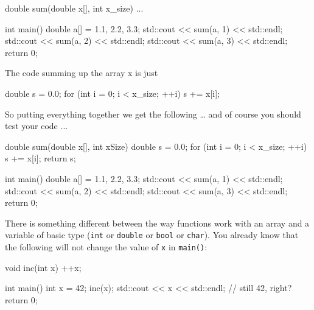 \begin{consolethree}[escapeinside=||]
double sum(double x[], int x_size)
{
    ...
}

int main()
{
    double a[] = {1.1, 2.2, 3.3};
    std::cout << sum(a, 1) << std::endl;
    std::cout << sum(a, 2) << std::endl;
    std::cout << sum(a, 3) << std::endl;
    return 0;
}
\end{consolethree}

The code summing up the array x is just

\begin{consolethree}[escapeinside=||]
double s = 0.0;
for (int i = 0; i < x\_size; ++i)
{
    s += x[i];
}
\end{consolethree}

So putting everything together we get the following \ldots{} and of
course you should test your code ...

\begin{consolethree}[escapeinside=||]
double sum(double x[], int xSize)
{
    double s = 0.0;
    for (int i = 0; i < x\_size; ++i)
    {
        s += x[i];
    }
    return s;
}

int main()
{
    double a[] = {1.1, 2.2, 3.3};
    std::cout << sum(a, 1) << std::endl;
    std::cout << sum(a, 2) << std::endl;
    std::cout << sum(a, 3) << std::endl;
    return 0;
}
\end{consolethree}








\newpage{}

There is something different between the way functions work with an
array and a variable of basic type (\texttt{int} or \texttt{double} or
\texttt{bool} or \texttt{char}). You already know that the following will
not change the value of \texttt{x} in \texttt{main()}:

\begin{consolethree}[escapeinside=||]
void inc(int x)
{
    ++x;
}

int main()
{
    int x = 42;
    inc(x);
    std::cout << x << std::endl; // still 42, right?
    return 0;
}
\end{consolethree}

